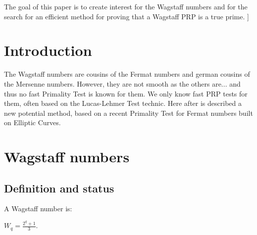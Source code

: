 \documentclass[latin1]{quadrature}
\newif\ifenfrancais
\begin{document}
\begin{article}
\begin{article}
{The goal of this paper is to create interest for the Wagstaff numbers and for the search for an efficient method for proving that a Wagstaff PRP is a true prime.}
]
\fi


\section{ Introduction }

\ifenfrancais
Les nombres de Wagstaff sont des cousins des nombres de Fermat et des cousins germains des nombres de Mersenne. Mais ils ne sont pas smooth comme eux... et on ne conna\^it donc pour le moment aucune m\'ethode permettant de prouver \textbf{rapidement} qu'un nombre de Wagstaff est premier. On sait uniquement trouver rapidement des PRP de Wagstaff au moyen de techniques souvent inspir\'ees du Lucas-Lehmer Test. On d\'ecrit ici une nouvelle m\'ethode potentielle, inspir\'ee d'un test r\'ecent de primalit\'e pour les nombres de Fermat bas\'e sur les Courbes Elliptiques.
\else
The Wagstaff numbers are cousins of the Fermat numbers and german cousins of the Mersenne numbers. However, they are not smooth as the others are... and thus no fast Primality Test is known for them. We only know fast PRP tests for them, often based on the Lucas-Lehmer Test technic. Here after is described a new potential method, based on a recent Primality Test for Fermat numbers built on Elliptic Curves.
\fi



\ifenfrancais
\section{ Les Nombres de Wagstaff}
\else
\section{ Wagstaff numbers }
\fi

\ifenfrancais
\subsection{ D\'efinition et statut }
\else
\subsection{ Definition and status }
\fi

\ifenfrancais
Un nombre de Wagstaff est d\'efini par :
\else
A Wagstaff number is:
\fi
 $W_q = \frac{\displaystyle 2^q+1}{\displaystyle3}$.
 

\end{article}
\end{article}
\end{document}
